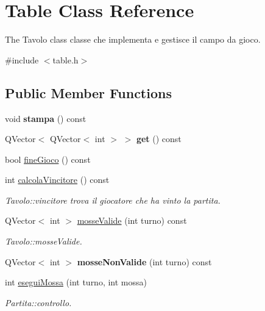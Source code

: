 \hypertarget{classTable}{}\section{Table Class Reference}
\label{classTable}


The Tavolo class classe che implementa e gestisce il campo da gioco.  




{\ttfamily \#include $<$table.\+h$>$}

\subsection*{Public Member Functions}
\begin{DoxyCompactItemize}
\item 
\mbox{\label{classTable_a78948abdf53e4f85773d3e6fabf017d3}} 
void {\bfseries stampa} () const
\item 
\mbox{\label{classTable_aeafea436918eac5d5f8968e4cb3d58ca}} 
Q\+Vector$<$ Q\+Vector$<$ int $>$ $>$ {\bfseries get} () const
\item 
bool \hyperlink{classTable_aa8597647b9049a5403941e3b05cd17cd}{fine\+Gioco} () const
\item 
int \hyperlink{classTable_a23f82e4f0607cb45c4fd834649ad2001}{calcola\+Vincitore} () const
\begin{DoxyCompactList}\small\item\em Tavolo\+::vincitore trova il giocatore che ha vinto la partita. \end{DoxyCompactList}\item 
Q\+Vector$<$ int $>$ \hyperlink{classTable_aa8f05fc3ad41761c70e62e118af5b515}{mosse\+Valide} (int turno) const
\begin{DoxyCompactList}\small\item\em Tavolo\+::mosse\+Valide. \end{DoxyCompactList}\item 
\mbox{\label{classTable_aae569e3c7b8606fbbfb7ffcbb0a71607}} 
Q\+Vector$<$ int $>$ {\bfseries mosse\+Non\+Valide} (int turno) const
\item 
int \hyperlink{classTable_ab011fd41be469dd6f67943a596bab4b0}{esegui\+Mossa} (int turno, int mossa)
\begin{DoxyCompactList}\small\item\em Partita\+::controllo. \end{DoxyCompactList}\item 

\end{DoxyCompactItemize}
